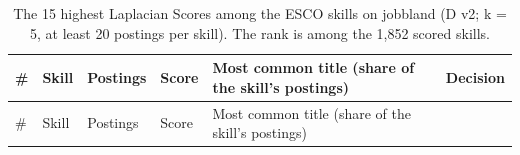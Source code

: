 \documentclass[
  letterpaper,
  DIV=11,
  numbers=noendperiod,
  sfdefaults=false]{scrartcl}
\begin{document}
\begin{longtable}[]{@{}
  >{\raggedright\arraybackslash}p{}
  >{\raggedright\arraybackslash}p{}
  >{\raggedright\arraybackslash}p{}
  >{\raggedright\arraybackslash}p{}
  >{\raggedright\arraybackslash}p{}
  >{\raggedright\arraybackslash}p{}@{}}
\caption{The 15 highest Laplacian Scores among the ESCO skills on
jobbland (D v2; k = 5, at least 20 postings per skill). The rank is
among the 1,852 scored skills.}\label{tbl-ls-highest}\tabularnewline
\toprule\noalign{}
\begin{minipage}[b]{\linewidth}\raggedright
\#
\end{minipage} & \begin{minipage}[b]{\linewidth}\raggedright
Skill
\end{minipage} & \begin{minipage}[b]{\linewidth}\raggedright
Postings
\end{minipage} & \begin{minipage}[b]{\linewidth}\raggedright
Score
\end{minipage} & \begin{minipage}[b]{\linewidth}\raggedright
Most common title (share of the skill's postings)
\end{minipage} & \begin{minipage}[b]{\linewidth}\raggedright
Decision
\end{minipage} \\
\midrule\noalign{}
\endfirsthead
\toprule\noalign{}
\begin{minipage}[b]{\linewidth}\raggedright
\#
\end{minipage} & \begin{minipage}[b]{\linewidth}\raggedright
Skill
\end{minipage} & \begin{minipage}[b]{\linewidth}\raggedright
Postings
\end{minipage} & \begin{minipage}[b]{\linewidth}\raggedright
Score
\end{minipage} & \begin{minipage}[b]{\linewidth}\raggedright
Most common title (share of the skill's postings)
\end{minipage} & \begin{minipage}[b]{\linewidth}\raggedright

\end{minipage}
\end{longtable}
\end{document}
